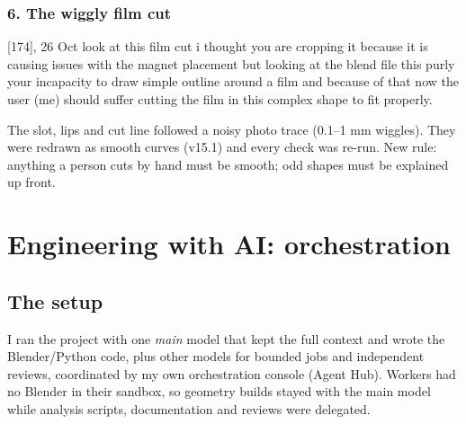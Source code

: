 \documentclass[10pt,a4paper,oneside]{article}
\begin{document}
\subsubsection{6. The wiggly film cut}
\begin{prompt}{[174], 26 Oct}
look at this film cut i thought you are cropping it because it is causing issues with the magnet placement but looking at the blend file this purly your incapacity to draw simple
outline around a film and because of that now the user (me) should suffer cutting the film in this complex shape to fit properly.
\end{prompt}
\begin{outcome}The slot, lips and cut line followed a noisy photo trace (0.1--1 mm wiggles). They were redrawn as smooth curves (v15.1) and every check was re-run.
New rule: anything a person cuts by hand must be smooth; odd shapes must be explained up front.\end{outcome}

\section{Engineering with AI: orchestration}
\subsection{The setup}
I ran the project with one \emph{main} model that kept the full context and wrote the Blender/Python code, plus other models for bounded jobs and
independent reviews, coordinated by my own orchestration console (Agent Hub). Workers had no Blender in their sandbox, so geometry builds stayed
with the main model while analysis scripts, documentation and reviews were delegated.
\end{document}
